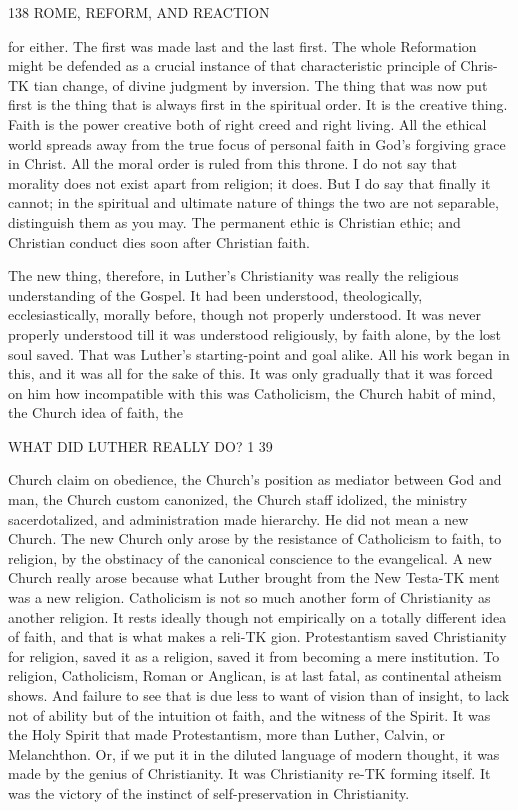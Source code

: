 \documentclass[12pt,a5paper,oneside]{book}
\begin{document}
{138 ROME, REFORM, AND REACTION 

for either. The first was made last and the last first. 
The whole Reformation might be defended as a 
crucial instance of that characteristic principle of Chris-TK
tian change, of divine judgment by inversion. The 
thing that was now put first is the thing that is always 
first in the spiritual order. It is the creative thing. 
Faith is the power creative both of right creed and 
right living. All the ethical world spreads away from 
the true focus of personal faith in God's forgiving grace 
in Christ. All the moral order is ruled from this 
throne. I do not say that morality does not exist 
apart from religion; it does. But I do say that 
finally it cannot; in the spiritual and ultimate nature 
of things the two are not separable, distinguish them 
as you may. The permanent ethic is Christian ethic; 
and Christian conduct dies soon after Christian faith. 

The new thing, therefore, in Luther's Christianity 
was really the religious understanding of the Gospel. 
It had been understood, theologically, ecclesiastically, 
morally before, though not properly understood. It 
was never properly understood till it was understood 
religiously, by faith alone, by the lost soul saved. 
That was Luther's starting-point and goal alike. All 
his work began in this, and it was all for the sake of 
this. It was only gradually that it was forced on him 
how incompatible with this was Catholicism, the 
Church habit of mind, the Church idea of faith, the 



WHAT DID LUTHER REALLY DO? 1 39 

Church claim on obedience, the Church's position as 
mediator between God and man, the Church custom 
canonized, the Church staff idolized, the ministry 
sacerdotalized, and administration made hierarchy. 
He did not mean a new Church. The new Church 
only arose by the resistance of Catholicism to faith, to 
religion, by the obstinacy of the canonical conscience 
to the evangelical. A new Church really arose 
because what Luther brought from the New Testa-TK
ment was a new religion. Catholicism is not so 
much another form of Christianity as another religion. 
It rests ideally though not empirically on a totally 
different idea of faith, and that is what makes a reli-TK
gion. Protestantism saved Christianity for religion, 
saved it as a religion, saved it from becoming a mere 
institution. To religion, Catholicism, Roman or 
Anglican, is at last fatal, as continental atheism shows. 
And failure to see that is due less to want of vision than 
of insight, to lack not of ability but of the intuition ot 
faith, and the witness of the Spirit. It was the Holy 
Spirit that made Protestantism, more than Luther, 
Calvin, or Melanchthon. Or, if we put it in the 
diluted language of modern thought, it was made by 
the genius of Christianity. It was Christianity re-TK
forming itself. It was the victory of the instinct 
of self-preservation in Christianity. 

}
\end{document}
